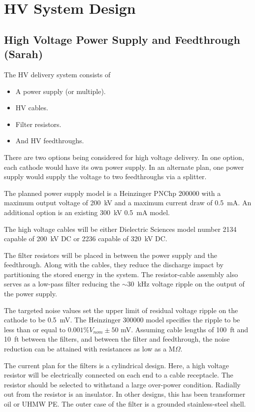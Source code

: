 \section{HV System Design}
\label{sec:fdsp-hv-design}

\subsection {High Voltage Power Supply and Feedthrough (Sarah)}
The HV delivery system consists of
\begin{itemize}
\item A power supply (or multiple).
\item HV cables.
\item Filter resistors.
\item And HV feedthroughs.
\end{itemize}

There are two options being considered for high voltage delivery.  In one option, each cathode would have its own power supply.  In an alternate plan, one power supply would supply the voltage to two feedthroughs via a splitter.

The planned power supply model is a Heinzinger PNChp 200000 with a maximum output voltage of \SI{200}{kV} and a maximum current draw of \SI{0.5}{mA}.  An additional option is an existing \SI{300}{kV} \SI{0.5}{mA} model. 

The high voltage cables will be either Dielectric Sciences model number 2134 capable of \SI{200}{kV} DC or 2236 capable of \SI{320}{kV} DC.  

The filter resistors will be placed in between the power supply and the feedthrough.  Along with the cables, they reduce the discharge impact by partitioning the stored energy in the system.  The resistor-cable assembly also serves as a low-pass filter reducing the $\sim$\SI{30}{kHz} voltage ripple on the output of the power supply.

The targeted noise values set the upper limit of residual voltage ripple on the cathode to be \SI{0.5}{mV}.  The Heinzinger 300000 model specifies the ripple to be less than or equal to $0.001\%V_{nom} \pm 50$ mV.  Assuming cable lengths of \SI{100}{ft} and \SI{10}{ft} between the filters, and between the filter and feedthrough, the noise reduction can be attained with resistances as low as a M$\Omega$. 

The current plan for the filters is a cylindrical design.  Here, a high voltage resistor will be electrically connected on each end to a cable receptacle.  The resistor should be selected to withstand a large over-power condition.  Radially out from the resistor is an insulator.  In other designs, this has been transformer oil or UHMW PE.  The outer case of the filter is a grounded stainless-steel shell.

